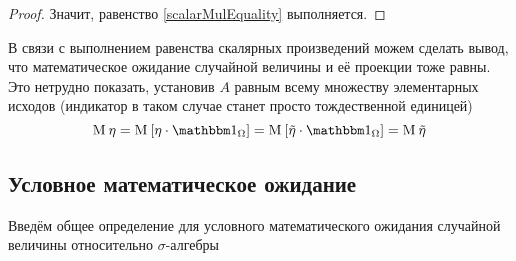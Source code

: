 \begin{proof}
\begin{comment}
Далее мы имеем полное математическое и моральное право
вынести $\eta$ за знак суммы.
Если с математикой всё очевидно (работает закон дистрибутивности),
то напомню о морально-этической стороне дела: нам нужно,
пройтись по всем возможным индикаторам $\indicatorof{H_k}$,
из которых лишь один сработает (будет равен единице, а не нулю),
поэтому сумма нужна лишь для того,
чтобы не писать в конце каждой строчки ``для тех $\omega$, что входят в $H_k$''
(помним, что случайная величина и индикатор --- функции
от элементарного события $\omega$)
$$\Mean{ \sum_{H_k \subseteq A} \eta \cdot \indicatorof{H_k} }
  = \Mean{\eta \left( \omega \right) \cdot \sum_{H_k \subseteq A}
      \indicatorof{H_k}\left( \omega \right)}$$

Сумма индикаторов непересекающихся событий --- индикатор их объединения,
которое является множеством $A$.
Не забываем, что оно может состоять из объединений уровней и только из них
(или же быть пустым)
$$\Mean{ \eta \cdot \sum_{H_k \subseteq A} \indicatorof{H_k} }
  = \Mean{ \eta \cdot \indicatorof{A} }$$
\end{comment}

Значит, равенство \eqref{scalarMulEquality} выполняется.
\end{proof}

\begin{remark}
  В связи с выполнением равенства скалярных произведений можем сделать вывод,
  что математическое ожидание случайной величины и её проекции тоже равны.
  Это нетрудно показать,
  установив $A$ равным всему множеству элементарных исходов
  (индикатор в таком случае станет просто тождественной единицей)
  $$\mean{\eta}
      = \Mean{ \eta \cdot \indicatorof{\Omega} }
      = \Mean{ \tilde{\eta} \cdot \indicatorof{\Omega} }
      = \mean{ \tilde{\eta} }$$
\end{remark}

\subsection{Условное математическое ожидание}
Введём общее определение для условного математического ожидания
случайной величины относительно $\sigma$-алгебры

